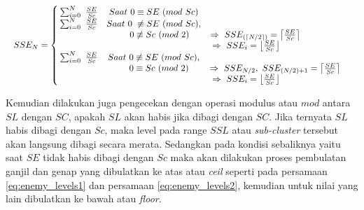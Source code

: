 \begin{equation}\label{eq:sub_enemy_levels2}
\resizebox{\columnwidth}{!}{%
	$SSE_{N} = \left\{\begin{matrix}
	\hspace{0.2em} \sum_{i = 0}^{N}\ \frac{SE}{Sc} & Saat\ 0 \equiv SE\ (mod\ Sc) & \\
	
	\hspace{0.2em} \sum_{i = 0}^{N}\ \frac{SE}{Sc} & Saat\ 0 \hspace{0.3em} \not\equiv SE\ (mod\ Sc), & \\
	&\hspace{1.3em}  0 \not\equiv Sc\ (mod\ 2) & \hspace{-4.5em} \Rightarrow\ SSE_{(\left \lceil N/2 \right \rceil)}  = \left \lceil \frac{SE}{Sc} \right \rceil &\\
	
	& & \hspace{-6.6em} \Rightarrow\ SSE_{i}  = \left \lfloor \frac{SE}{Sc} \right \rfloor &\\
	
	\hspace{0.2em} \sum_{i = 0}^{N}\ \frac{SE}{Sc} & Saat\ 0 \not\equiv SE\ (mod\ Sc), & \\
	&\hspace{1.2em}  0 \equiv Sc\ (mod\ 2) & \Rightarrow\ SSE_{N/2},\ SSE_{(N/2) + 1}  = \left \lceil \frac{SE}{Sc} \right \rceil &\\
	
	& & \hspace{-6.6em} \Rightarrow\ SSE_{i}  = \left \lfloor \frac{SE}{Sc} \right \rfloor &\\
	\end{matrix}\right.$%
}
\end{equation}

Kemudian dilakukan juga pengecekan dengan operasi modulus atau $mod$ antara $SL$ dengan $SC$, apakah $SL$ akan habis jika dibagi dengan $SC$. Jika ternyata $SL$ habis dibagi dengan $Sc$, maka level pada range $SSL$ atau \textit{sub-cluster} tersebut akan langsung dibagi secara merata. Sedangkan pada kondisi sebaliknya yaitu saat $SE$ tidak habis dibagi dengan $Sc$ maka akan dilakukan proses pembulatan ganjil dan genap yang dibulatkan ke atas atau \textit{ceil} seperti pada persamaan \ref{eq:enemy_levels1} dan persamaan \ref{eq:enemy_levels2}, kemudian untuk nilai yang lain dibulatkan ke bawah atau \textit{floor}.
\vspace{1ex}

